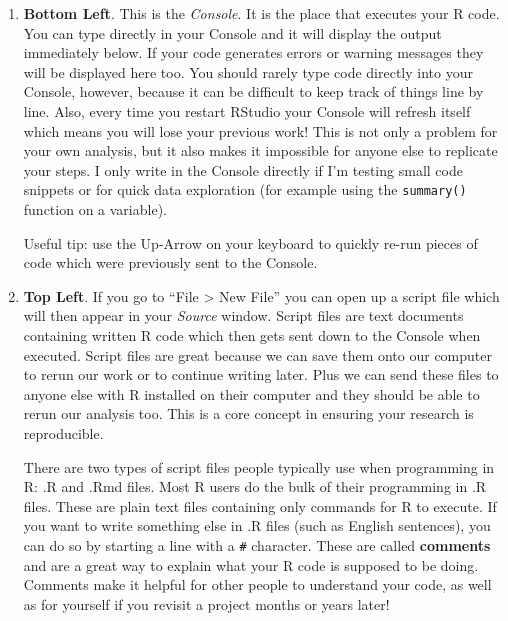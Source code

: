 \documentclass[
  letterpaper,
]{book}
\theoremstyle{definition}
\theoremstyle{definition}
\theoremstyle{plain}
\theoremstyle{definition}
\theoremstyle{plain}
\theoremstyle{plain}
\theoremstyle{remark}
\begin{document}
\begin{enumerate}
\def\labelenumi{\arabic{enumi}.}
\item
  \textbf{Bottom Left}. This is the \emph{Console}. It is the place that
  executes your R code. You can type directly in your Console and it
  will display the output immediately below. If your code generates
  errors or warning messages they will be displayed here too. You should
  rarely type code directly into your Console, however, because it can
  be difficult to keep track of things line by line. Also, every time
  you restart RStudio your Console will refresh itself which means you
  will lose your previous work! This is not only a problem for your own
  analysis, but it also makes it impossible for anyone else to replicate
  your steps. I only write in the Console directly if I'm testing small
  code snippets or for quick data exploration (for example using the
  \texttt{summary()} function on a variable).

  Useful tip: use the Up-Arrow on your keyboard to quickly re-run pieces
  of code which were previously sent to the Console.
\item
  \textbf{Top Left}. If you go to ``File \textgreater{} New File'' you
  can open up a script file which will then appear in your \emph{Source}
  window. Script files are text documents containing written R code
  which then gets sent down to the Console when executed. Script files
  are great because we can save them onto our computer to rerun our work
  or to continue writing later. Plus we can send these files to anyone
  else with R installed on their computer and they should be able to
  rerun our analysis too. This is a core concept in ensuring your
  research is reproducible.

  There are two types of script files people typically use when
  programming in R: .R and .Rmd files. Most R users do the bulk of their
  programming in .R files. These are plain text files containing only
  commands for R to execute. If you want to write something else in .R
  files (such as English sentences), you can do so by starting a line
  with a \texttt{\#} character. These are called \textbf{comments} and
  are a great way to explain what your R code is supposed to be doing.
  Comments make it helpful for other people to understand your code, as
  well as for yourself if you revisit a project months or years later!


\end{enumerate}
\end{document}
